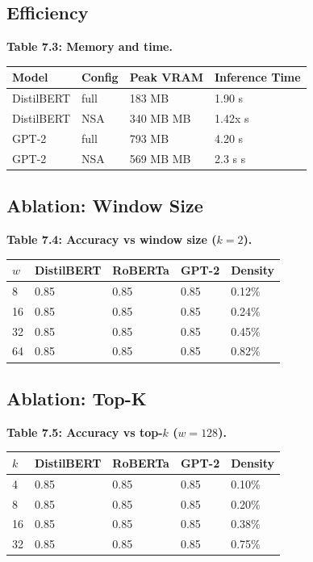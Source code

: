 \subsection{Efficiency}

\textbf{Table 7.3: Memory and time.}

\begin{table}[H]
\centering
\small
\begin{tabular}{llll}
\toprule
\textbf{Model} & \textbf{Config} & \textbf{Peak VRAM} & \textbf{Inference Time} \\
\midrule
DistilBERT & full & 183 MB & 1.90 s \\
DistilBERT & NSA & 340 MB MB & 1.42x s \\
GPT-2 & full & 793 MB & 4.20 s \\
GPT-2 & NSA & 569 MB MB & 2.3 s s \\
\bottomrule
\end{tabular}
\end{table}

\subsection{Ablation: Window Size}

\textbf{Table 7.4: Accuracy vs window size ($k = 2$).}

\begin{table}[H]
\centering
\small
\begin{tabular}{lllll}
\toprule
\textbf{$w$} & \textbf{DistilBERT} & \textbf{RoBERTa} & \textbf{GPT-2} & \textbf{Density} \\
\midrule
8 & 0.85 & 0.85 & 0.85 & 0.12\% \\
16 & 0.85 & 0.85 & 0.85 & 0.24\% \\
32 & 0.85 & 0.85 & 0.85 & 0.45\% \\
64 & 0.85 & 0.85 & 0.85 & 0.82\% \\
\bottomrule
\end{tabular}
\end{table}

\subsection{Ablation: Top-K}

\textbf{Table 7.5: Accuracy vs top-$k$ ($w = 128$).}

\begin{table}[H]
\centering
\small
\begin{tabular}{lllll}
\toprule
\textbf{$k$} & \textbf{DistilBERT} & \textbf{RoBERTa} & \textbf{GPT-2} & \textbf{Density} \\
\midrule
4 & 0.85 & 0.85 & 0.85 & 0.10\% \\
8 & 0.85 & 0.85 & 0.85 & 0.20\% \\
16 & 0.85 & 0.85 & 0.85 & 0.38\% \\
32 & 0.85 & 0.85 & 0.85 & 0.75\% \\
\bottomrule
\end{tabular}
\end{table}

